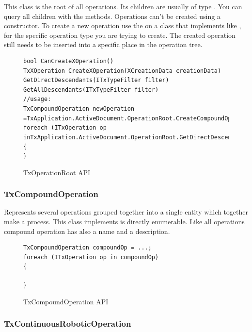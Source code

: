 This class is the root of all operations.
Its children are usually of type .
You can query all children with the  methods.
Operations can't be created using a constructor.
To create a new operation use the  on a class that implements  like , for the specific operation type you are trying to create.
The created operation still needs to be inserted into a specific place in the operation tree.

\begin{figure}[H]
    \caption{TxOperationRoot API}
    \centering
    \begin{verbatim}
bool CanCreateXOperation()
TxXOperation CreateXOperation(XCreationData creationData)
GetDirectDescendants(ITxTypeFilter filter)
GetAllDescendants(ITxTypeFilter filter)
//usage:
TxCompoundOperation newOperation =TxApplication.ActiveDocument.OperationRoot.CreateCompoundOperation(newTxCompoundOperationCreationData("name"));
foreach (ITxOperation op inTxApplication.ActiveDocument.OperationRoot.GetDirectDescendants(newTxNoTypeFilter()))
{
}
    \end{verbatim}
    \label{fig:CodeTxOperationRoot}
\end{figure}


\subsubsection{TxCompoundOperation}

Represents several operations grouped together into a single entity which together make a process.
This class implements is directly enumerable.
Like all operations compound operation has also a name and a description.

\begin{figure}[H]
    \caption{TxCompoundOperation API}
    \centering
    \begin{verbatim}
TxCompoundOperation compoundOp = ...;
foreach (ITxOperation op in compoundOp)
{

}
    \end{verbatim}
    \label{fig:CodeTxCompoundOperation}
\end{figure}


\subsubsection{TxContinuousRoboticOperation}

